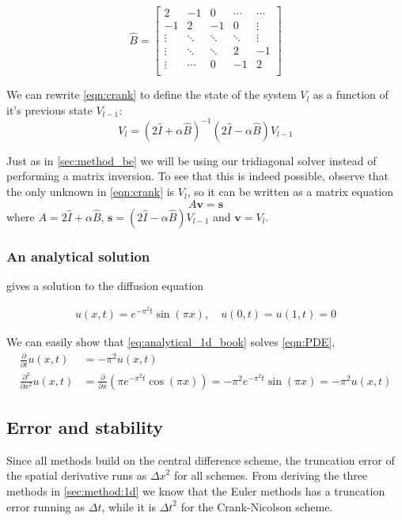 \documentclass[10pt,a4paper]{article}
\newcommand{\dt}{{\Delta t}}
\newcommand{\dx}{{\Delta x}}
\newcommand{\fracpt}{\frac{\partial}{\partial t}}
\newcommand{\fracpx}{\frac{\partial}{\partial x}}
\newcommand{\fracpxx}{\frac{\partial^2}{\partial x^2}}
\begin{document}
\[
\hat{B} = \begin{bmatrix}
2 & -1 & 0 & \cdots & \cdots \\
-1 & 2 & -1 & 0 & \vdots \\
\vdots & \ddots & \ddots & \ddots & \vdots \\
\vdots & \ddots & \ddots & 2 & -1 \\
\vdots & \cdots & 0 & -1 & 2 \\
\end{bmatrix}
\]

We can rewrite \vref{eqn:crank} to define the state of the system $V_l$ as a function of it's previous state $V_{l-1}$:
\begin{equation}
V_l = (2\hat{I}+\alpha \hat{B})^{-1} (2\hat{I} - \alpha \hat{B})V_{l-1}
\end{equation}

Just as in \vref{sec:method_be} we will be using our tridiagonal solver instead of performing a matrix inversion. To see that this is indeed possible, observe that the only unknown in \vref{eqn:crank} is $V_l$, so it can be written as a matrix equation \[
A \mathbf{v} = \mathbf{s}
\] where $A = 2\hat{I}+\alpha \hat{B}$, $ \mathbf{s} = (2\hat{I} - \alpha \hat{B})V_{l-1}$ and $\mathbf{v} = V_l$.



\subsubsection{An analytical solution}\label{sec:analytical_1d}
\cite{inf-mat2351_book} gives a solution to the diffusion equation

\begin{align}\label{eq:analytical_1d_book}
    u(x, t) = e^{-\pi^2 t} \sin(\pi x) , \quad u(0, t) = u(1, t) = 0
\end{align}

We can easily show that \vref{eq:analytical_1d_book} solves \vref{eqn:PDE},
\begin{align}
\fracpt u(x, t) &= -\pi^2 u(x, t) \\
\fracpxx u(x, t) &= \fracpx \left(\pi e^{-\pi^2 t} \cos(\pi x) \right)
= -\pi^2 e^{-\pi^2 t} \sin(\pi x) = -\pi^2 u(x, t)
\end{align}



\subsection{Error and stability}
\label{sec:method:1d:error}
Since all methods build on the central difference scheme, the truncation error of the spatial derivative runs as $\dx^2$ for all schemes. From deriving the three methods in \ref{sec:method:1d} we know that the Euler methods has a truncation error running as $\dt$, while it is $\dt^2$ for the Crank-Nicolson scheme.
\\\\
\end{document}
